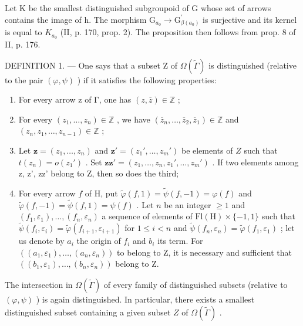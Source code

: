 Let K be the smallest distinguished subgroupoid of G whose set of arrows contains the image of h. The morphism \(\mathrm{G}_{a_{0}} \rightarrow \mathrm{G}^{\prime}_{\beta(a_{0})}\) is surjective and its kernel is equal to \(K_{a_{0}}\) (II, p. 170, prop. 2). The proposition then follows from prop. 8 of II, p. 176.

DEFINITION 1. --- One says that a subset Z of \(\Omega(\widetilde{\Gamma})\) is distinguished (relative to the pair \((\varphi, \psi)\) ) if it satisfies the following properties:

\begin{enumerate}
\def\labelenumi{(\roman{enumi})}
\item
  For every arrow z of Γ, one has \((z,\overline{z})\in\mathbb{Z}\) ;
\item
  For every \((z_{1},\ldots ,z_{n})\in \mathbb{Z}\) , we have \((\overline{z}_n,\dots ,\overline{z}_2,\overline{z}_1)\in \mathbb{Z}\) and \((z_{n},z_{1},\ldots ,z_{n - 1})\in \mathbb{Z}\) ;
\item
  Let \(\mathbf{z} = (z_1, \ldots, z_n)\) and \(\mathbf{z}' = (z_1', \ldots, z_m')\) be elements of \(Z\) such that \(t(z_n) = o(z_1')\) . Set \(\mathbf{z}\mathbf{z}' = (z_1, \ldots, z_n, z_1', \ldots, z_m')\) . If two elements among z, z', zz' belong to Z, then so does the third;
\item
  For every arrow \(f\) of H, put \(\widetilde{\varphi}(f,1) = \widetilde{\psi}(f,-1) = \varphi(f)\) and \(\widetilde{\varphi}(f,-1) = \widetilde{\psi}(f,1) = \psi(f)\) . Let \(n\) be an integer \(\geqslant 1\) and \((f_1,\varepsilon_1),\ldots,(f_n,\varepsilon_n)\) a sequence of elements of \(\mathrm{Fl}(\mathrm{H})\times \{-1,1\}\) such that \(\widetilde{\psi}(f_i,\varepsilon_i) = \widetilde{\varphi}(f_{i+1},\varepsilon_{i+1})\) for \(1\leqslant i < n\) and \(\widetilde{\psi}(f_n,\varepsilon_n) = \widetilde{\varphi}(f_1,\varepsilon_1)\) ; let us denote by \(a_i\) the origin of \(f_i\) and \(b_i\) its term. For \(((a_1,\varepsilon_1),\ldots,(a_n,\varepsilon_n))\) to belong to Z, it is necessary and sufficient that \(((b_1,\varepsilon_1),\ldots,(b_n,\varepsilon_n))\) belong to Z.
\end{enumerate}

The intersection in \(\Omega(\widetilde{\Gamma})\) of every family of distinguished subsets (relative to \((\varphi, \psi)\) ) is again distinguished. In particular, there exists a smallest distinguished subset containing a given subset \(Z\) of \(\Omega(\widetilde{\Gamma})\) .

